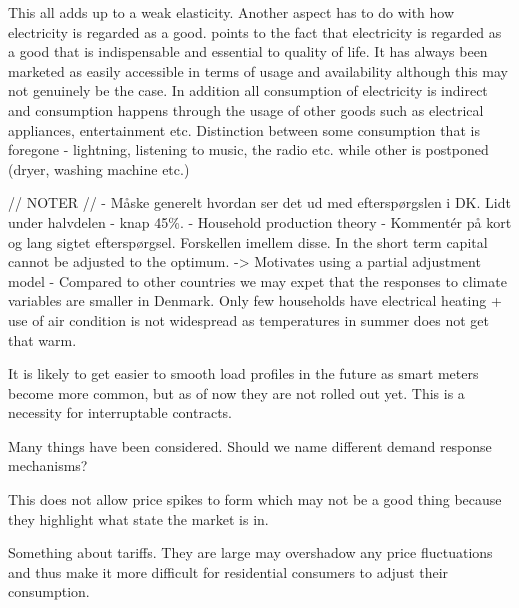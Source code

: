 This all adds up to a weak elasticity. Another aspect has to do with how electricity is regarded as a good. \citep{kirschen2003demand} points to the fact that electricity is regarded as a good that is indispensable and essential to quality of life. It has always been marketed as easily accessible in terms of usage and availability although this may not genuinely be the case. In addition all consumption of electricity is indirect and consumption happens through the usage of other goods such as electrical appliances, entertainment etc. Distinction between some consumption that is foregone - lightning, listening to music, the radio etc. while other is postponed (dryer, washing machine etc.) 


// NOTER // 
- Måske generelt hvordan ser det ud med efterspørgslen i DK. Lidt under halvdelen - knap 45\%. 
- Household production theory 
- Kommentér på kort og lang sigtet efterspørgsel. Forskellen imellem disse. In the short term capital cannot be adjusted to the optimum. -> Motivates using a partial adjustment model  
- Compared to other countries we may expet that the responses to climate variables are smaller in Denmark. Only few households have electrical heating + use of air condition is not widespread as temperatures in summer does not get that warm. 

It is likely to get easier to smooth load profiles in the future as smart meters become more common, but as of now they are not rolled out yet. This is a necessity for interruptable contracts. 


Many things have been considered. Should we name different demand response mechanisms? 

This does not allow price spikes to form which may not be a good thing because they highlight what state the market is in. 

Something about tariffs. They are large may overshadow any price fluctuations and thus make it more difficult for residential consumers to adjust their consumption. 

\citep{kirschen2003demand}
 



